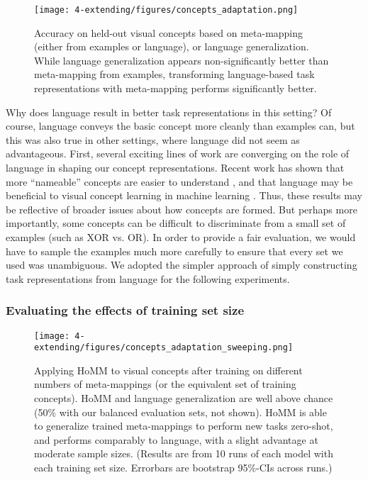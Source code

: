 \begin{figure}
\centering
\texttt{[image: 4-extending/figures/concepts\_adaptation.png]}
\caption[Accuracy on held-out visual concepts.]{Accuracy on held-out visual concepts based on meta-mapping (either from examples or language), or language generalization. While language generalization appears non-significantly better than meta-mapping from examples, transforming language-based task representations with meta-mapping performs significantly better.} \label{fig:extending_concepts_adaptation} 
\end{figure}

Why does language result in better task representations in this setting? Of course, language conveys the basic concept more cleanly than examples can, but this was also true in other settings, where language did not seem as advantageous. First, several exciting lines of work are converging on the role of language in shaping our concept representations. Recent work has shown that more ``nameable'' concepts are easier to understand \citep{Lupyan2020}, and that language may be beneficial to visual concept learning in machine learning \citep{Mu2019}. Thus, these results may be reflective of broader issues about how concepts are formed. But perhaps more importantly, some concepts can be difficult to discriminate from a small set of examples (such as XOR vs. OR). In order to provide a fair evaluation, we would have to sample the examples much more carefully to ensure that every set we used was unambiguous. We adopted the simpler approach of simply constructing task representations from language for the following experiments. \par

\subsubsection{Evaluating the effects of training set size}
\begin{figure}[htb]
\centering
\texttt{[image: 4-extending/figures/concepts\_adaptation\_sweeping.png]}
\caption[Applying HoMM to visual concepts after training on different numbers of meta-mappings.]{Applying HoMM to visual concepts after training on different numbers of meta-mappings (or the equivalent set of training concepts). HoMM and language generalization are well above chance (50\% with our balanced evaluation sets, not shown). HoMM is able to generalize trained meta-mappings to perform new tasks zero-shot, and performs comparably to language, with a slight advantage at moderate sample sizes. (Results are from 10 runs of each model with each training set size. Errorbars are bootstrap 95\%-CIs across runs.)} \label{fig:extending_concepts_sweeping_results}
\end{figure}


